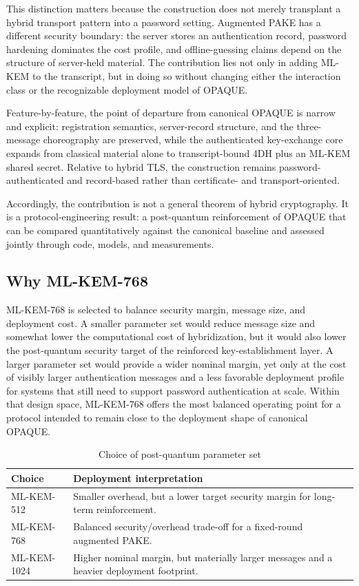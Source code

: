 \documentclass[conference]{IEEEtran}
\begin{document}
This distinction matters because the construction does not merely transplant a hybrid transport pattern into a password setting. Augmented PAKE has a different security boundary: the server stores an authentication record, password hardening dominates the cost profile, and offline-guessing claims depend on the structure of server-held material. The contribution lies not only in adding ML-KEM to the transcript, but in doing so without changing either the interaction class or the recognizable deployment model of OPAQUE.

Feature-by-feature, the point of departure from canonical OPAQUE is narrow and explicit: registration semantics, server-record structure, and the three-message choreography are preserved, while the authenticated key-exchange core expands from classical material alone to transcript-bound 4DH plus an ML-KEM shared secret. Relative to hybrid TLS, the construction remains password-authenticated and record-based rather than certificate- and transport-oriented.

Accordingly, the contribution is not a general theorem of hybrid cryptography. It is a protocol-engineering result: a post-quantum reinforcement of OPAQUE that can be compared quantitatively against the canonical baseline and assessed jointly through code, models, and measurements.

\subsection{Why ML-KEM-768}

ML-KEM-768 is selected to balance security margin, message size, and deployment cost. A smaller parameter set would reduce message size and somewhat lower the computational cost of hybridization, but it would also lower the post-quantum security target of the reinforced key-establishment layer. A larger parameter set would provide a wider nominal margin, yet only at the cost of visibly larger authentication messages and a less favorable deployment profile for systems that still need to support password authentication at scale. Within that design space, ML-KEM-768 offers the most balanced operating point for a protocol intended to remain close to the deployment shape of canonical OPAQUE.

\begin{table}[t]
\caption{Choice of post-quantum parameter set}
\label{tab:acit-mlkem-choice}
\centering
\footnotesize
\begin{tabularx}{\columnwidth}{@{}L{2.1cm}Y@{}}
\toprule
Choice & Deployment interpretation \\
\midrule
ML-KEM-512 & Smaller overhead, but a lower target security margin for long-term reinforcement. \\
ML-KEM-768 & Balanced security/overhead trade-off for a fixed-round augmented PAKE. \\
ML-KEM-1024 & Higher nominal margin, but materially larger messages and a heavier deployment footprint. \\
\bottomrule
\end{tabularx}
\end{table}
\end{document}
